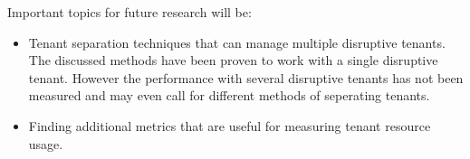 Important topics for future research will be:
\begin{itemize}
	\item Tenant separation techniques that can manage multiple disruptive tenants.\\
		The discussed methods have been proven to work with a single disruptive tenant.
		However the performance with several disruptive tenants has not been measured and may even call for different methods of seperating tenants.
	\item Finding additional metrics that are useful for measuring tenant resource usage.%
\end{itemize}

